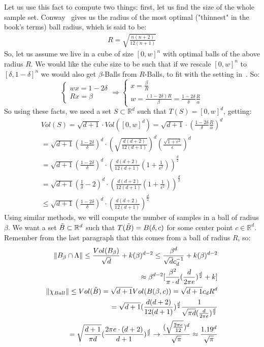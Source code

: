 Let us use this fact to compute two things: first, let us find the size of the whole sample set. Conway~\cite{conway2013sphere} gives us the radius of the most optimal ("thinnest" in the book's terms) ball radius, which is said to be:
\begin{align}
    R=\sqrt{\frac{n(n+2)}{12(n+1)}}
\end{align}
So, let us assume we live in a cube of size $[0,w]^n$ with optimal balls of the above radius $R$. We would like the cube size to be such that if we rescale $[0,w]^n$ to $[\delta,1-\delta]^n$ we would also get $\beta$-Balls from $R$-Balls, to fit with the setting in~\cite{dayan2023near}. So:
\begin{equation}
    \begin{cases}
      wx=1-2\delta\\
      Rx=\beta
    \end{cases}
    \Rightarrow 
    \begin{cases}
         x=\frac{\beta}{R} \\
         w=\frac{(1-2\delta)R}{\beta} = \frac{1-2\delta}{\delta}\frac{R}{\alpha}
    \end{cases}
\end{equation}
So using these facts, we need a set $S\subset \mathbb{R}^d$ such that $T(S)=[0,w]^d$, getting:
\begin{align*}
    Vol(S)=\sqrt{d+1}\cdot Vol([0,w]^d)=\sqrt{d+1}\cdot(\frac{1-2\delta}{\delta}\frac{R}{\alpha})^d\\
    =\sqrt{d+1}(\frac{1-2\delta}{\delta})^d\cdot(\sqrt{\frac{d(d+2)}{12(d+1)}})^d(\frac{\sqrt{1+\epsilon^2}}{\epsilon})^d \\
    =\sqrt{d+1}(\frac{1-2\delta}{\delta})^d\cdot(\frac{d(d+2)}{12(d+1)}(1+\frac{1}{\epsilon^2}))^{\frac{d}{2}}\\
    = \sqrt{d+1}(\frac{1}{\delta} - 2)^d\cdot(\frac{d(d+2)}{12(d+1)}(1+\frac{1}{\epsilon^2}))^{\frac{d}{2}}\\
    \leq \sqrt{d+1}(\frac{1-2\delta}{\delta})^d\cdot(\frac{d(d+2)}{12(d+1)})^{\frac{d}{2}}
\end{align*}
Using similar methods, we will compute the number of samples in a ball of radius $\beta$. We want a set $\Tilde{B}\subset \mathbb{R}^d$ such that $T(\Tilde{B})=B(\delta,c)$ for some center point $c\in\mathbb{R}^d$. Remember from the last paragraph that this comes from a ball of radius $R$, so:
\begin{align*}
    \|B_\beta\cap\Lambda\|\leq \frac{Vol(B_\beta)}{\sqrt{d}}+k(\beta)^{d-2}\leq \frac{\beta^d}{\sqrt{d}c_d^{-1}}+k(\beta)^{d-2}\\
    \approx\beta^{d-2}[\frac{\beta^2}{\pi\cdot d}(\frac{d}{2\pi e})^{\frac{d}{2}} + k]\\
    \|\chi_{Ball}\|\leq Vol(\Tilde{B})=\sqrt{d+1}Vol(B(\beta,c))=\sqrt{d+1}c_dR^d\\
    =\sqrt{d+1}(\frac{d(d+2)}{12(d+1)})^{\frac{d}{2}}\frac{1}{\sqrt{\pi d}(\frac{d}{2\pi e})^{\frac{d}{2}}}\\
    =\sqrt{\frac{d+1}{\pi d}}(\frac{2\pi e \cdot (d+2)}{d+1})^{\frac{d}{2}}\rightarrow \frac{(\sqrt{\frac{2\pi e}{12}})^d}{\sqrt{\pi}}\approx\frac{1.19^d}{\sqrt{\pi}}
\end{align*}

